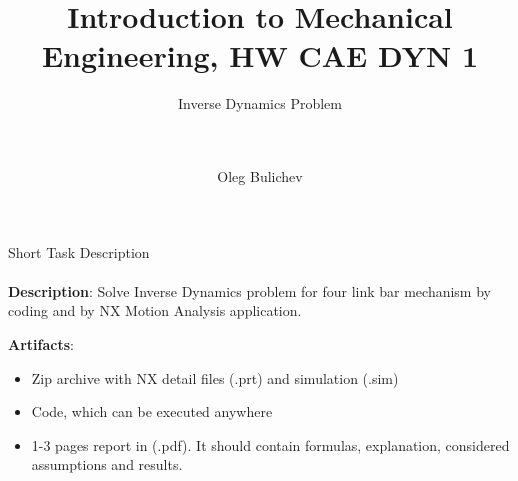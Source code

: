 \documentclass[aspectratio=169]{beamer}
\title[IME]{Introduction to Mechanical Engineering, HW CAE DYN 1} %
\subtitle{Inverse Dynamics Problem
\\ \  \\ \ 
         } %
\author{Oleg Bulichev}
\newcommand{\fbckg}[1]{\usebackgroundtemplate{\texttt{[image: \#1]}}}%
\begin{document}
\setlength{\abovedisplayskip}{0pt}
\setlength{\belowdisplayskip}{0pt}
\setlength{\abovedisplayshortskip}{0pt}
\setlength{\belowdisplayshortskip}{0pt}

\fbckg{fibeamer/figs/title_page.png}

\fbckg{fibeamer/figs/common.png}

\note{\scriptsize \begin{itemize}
        \item \
    \end{itemize}}

\note{
   \ 
}

\begin{frame}[t]{Short Task Description}
    \framesubtitle{}
    \textbf{Description}: Solve Inverse Dynamics problem for four link bar mechanism by coding and by NX Motion Analysis application.

    \textbf{Artifacts}: 
    \begin{itemize}
        \item Zip archive with NX detail files (.prt) and simulation (.sim)
        \item Code, which can be executed anywhere
        \item 1-3 pages report in (.pdf). It should contain formulas, explanation, considered assumptions and results.
    \end{itemize}
\end{frame}
\end{document}
